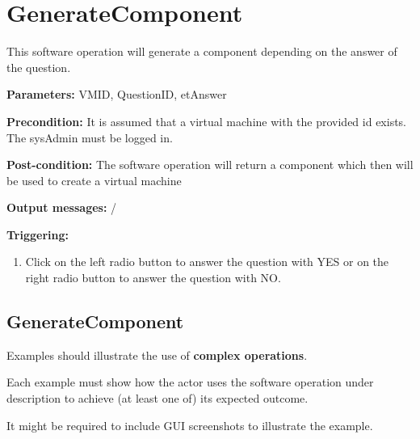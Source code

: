 \section{GenerateComponent}
\label{operation:GenerateComponent}
This software operation will generate a component depending on the answer of the
question.
\begin{description}

\item \textbf{Parameters:} VMID, QuestionID, etAnswer
\item \textbf{Precondition:} It is assumed that a virtual machine with the
provided id exists. The sysAdmin must be logged in.
\item \textbf{Post-condition:} The software operation will return a component
which then will be used to create a virtual machine
\item \textbf{Output messages:} /

\item \textbf{Triggering:}
\begin{enumerate}
\item Click on the left radio button to answer the question with YES or on 
the right radio button to answer the question with NO.

\end{enumerate}

 
\end{description}

\subsection{GenerateComponent}
Examples should illustrate the use of \textbf{complex operations}.

Each example must show how the actor uses the software operation under
description to achieve (at least one of) its expected outcome.

It might be required to include GUI screenshots to illustrate the example.









